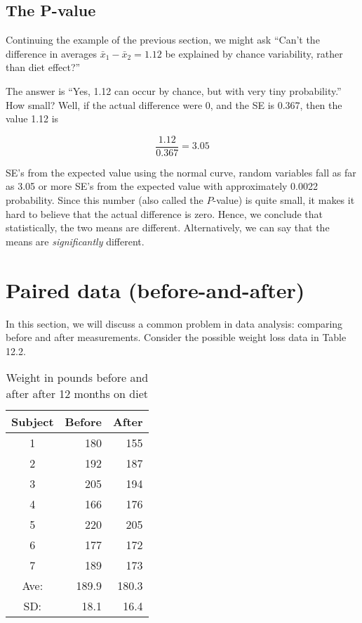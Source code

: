 \documentclass[11pt]{book}\usepackage[]{graphicx}\usepackage[]{color}
\begin{document}
\subsection{The P-value}

Continuing the example of the previous section, we might ask ``Can't the difference in averages $\bar{x}_1 - \bar{x}_2 = 1.12$ be explained by chance variability, rather than diet effect?''

The answer is ``Yes, 1.12 can occur by chance, but with very tiny probability.''  How small? Well, if the actual difference were 0, and the SE is 0.367, then the value 1.12 is

\begin{equation*}
\frac{1.12}{0.367} = 3.05
\end{equation*}

SE's from the expected value using the normal curve, random variables fall as far as 3.05 or more SE's from the expected value with approximately 0.0022 probability.  Since this number (also called the $P$-value) is quite small, it makes it hard to believe that the actual difference is zero.  Hence, we conclude that statistically, the two means are different.  Alternatively, we can say that the means are \textit{significantly} different.


\section{Paired data (before-and-after)}

In this section, we will discuss a common problem in data analysis: comparing before and after measurements.  Consider the possible weight loss data in Table 12.2.

\begin{table}[ht]
\centering
\caption{Weight in pounds before and after after 12 months on diet}
\begin{tabular}{@{} crr @{}} \hline
Subject & Before & After \\ \hline
1 & 180 & 155 \\
2 & 192 & 187 \\
3 & 205 & 194 \\
4 & 166 & 176 \\
5 & 220 & 205 \\
6 & 177 & 172 \\
7 & 189 & 173 \\ \hline
Ave: & 189.9 & 180.3 \\
SD:  & 18.1 & 16.4 \\ \hline
\end{tabular}
\end{table}
\end{document}
